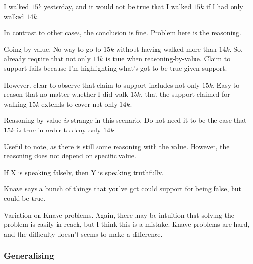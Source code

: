 \begin{note}[Problematic]
  \begin{illustration}
    I walked \(15k\) yesterday, and it would not be true that I walked \(15k\) if I had only walked \(14k\).
  \end{illustration}
  In contrast to other cases, the conclusion is fine.
  Problem here is the reasoning.

  Going by value.
  No way to go to \(15k\) without having walked more than \(14k\).
  So, already require that not only \(14k\) is true when reasoning-by-value.
  Claim to support fails because I'm highlighting what's got to be true given support.

  However, clear to observe that claim to support includes not only \(15k\).
  Easy to reason that no matter whether I did walk \(15k\), that the support claimed for walking \(15k\) extends to cover not only \(14k\).

  Reasoning-by-value \emph{is} strange in this scenario.
  Do not need it to be the case that \(15k\) is true in order to deny only \(14k\).


  Useful to note, as there is still some reasoning with the value.
  However, the reasoning does not depend on specific value.
\end{note}

\begin{note}[Knaves]
  \begin{illustration}
    If X is speaking falsely, then Y is speaking truthfully.

    Knave says a bunch of things that you've got could support for being false, but could be true.
  \end{illustration}
  Variation on Knave problems.
  Again, there may be intuition that solving the problem is easily in reach, but I think this is a mistake.
  Knave problems are hard, and the difficulty doesn't seems to make a difference.
\end{note}

\subsubsection{Generalising \nI{}}
\label{sec:generalising-ni}

